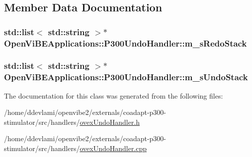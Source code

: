 \subsection{Member Data Documentation}
\hypertarget{classOpenViBEApplications_1_1P300UndoHandler_a4db99181e46cfb670e08964d561486fa}{
\subsubsection[{m\_\-sRedoStack}]{\setlength{\rightskip}{0pt plus 5cm}std::list$<$ std::string $>$$\ast$ {\bf OpenViBEApplications::P300UndoHandler::m\_\-sRedoStack}}}
\label{classOpenViBEApplications_1_1P300UndoHandler_a4db99181e46cfb670e08964d561486fa}
\hypertarget{classOpenViBEApplications_1_1P300UndoHandler_a79d978d7bb9e904e5500f39e32cc4341}{
\subsubsection[{m\_\-sUndoStack}]{\setlength{\rightskip}{0pt plus 5cm}std::list$<$ std::string $>$$\ast$ {\bf OpenViBEApplications::P300UndoHandler::m\_\-sUndoStack}}}
\label{classOpenViBEApplications_1_1P300UndoHandler_a79d978d7bb9e904e5500f39e32cc4341}


The documentation for this class was generated from the following files:\begin{DoxyCompactItemize}
\item 
/home/ddevlami/openvibe2/externals/coadapt-\/p300-\/stimulator/src/handlers/\hyperlink{ovexUndoHandler_8h}{ovexUndoHandler.h}\item 
/home/ddevlami/openvibe2/externals/coadapt-\/p300-\/stimulator/src/handlers/\hyperlink{ovexUndoHandler_8cpp}{ovexUndoHandler.cpp}\end{DoxyCompactItemize}
